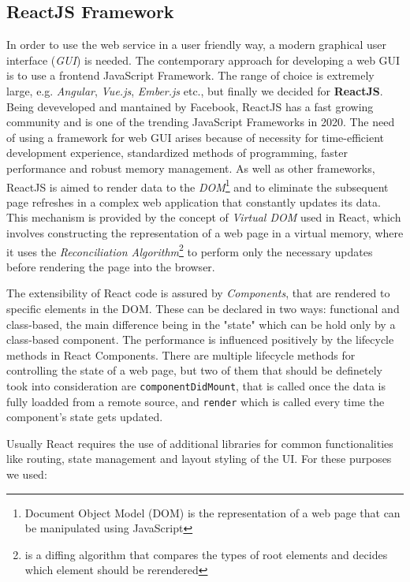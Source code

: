 \subsection{ReactJS Framework}
In order to use the web service in a user friendly way, a modern graphical user interface (\textit{GUI}) is needed. The contemporary approach for developing a web GUI is to use a frontend JavaScript Framework. The range of choice is extremely large, e.g. \textit{Angular}, \textit{Vue.js}, \textit{Ember.js} etc., but finally we decided for \textbf{ReactJS}. Being deveveloped and mantained by Facebook, ReactJS has a fast growing community and is one of the trending JavaScript Frameworks in 2020. The need of using a framework for web GUI arises because of necessity for time-efficient development experience, standardized methods of programming, faster performance and robust memory management. As well as other frameworks, ReactJS is aimed to render data to the \textit{DOM}\footnote{Document Object Model (DOM) is the representation of a web page that can be manipulated using JavaScript} and to eliminate the subsequent page refreshes in a complex web application that constantly updates its data. This mechanism is provided by the concept of \textit{Virtual DOM} used in React, which involves constructing the representation of a web page in a virtual memory, where it uses the \textit{Reconciliation Algorithm}\footnote{is a diffing algorithm that compares the types of root elements and decides which element should be rerendered} to perform only the necessary updates before rendering the page into the browser. \par
The extensibility of React code is assured by \textit{Components}, that are rendered to specific elements in the DOM. These can be declared in two ways: functional and class-based, the main difference being in the "state" which can be hold only by a class-based component. The performance is influenced positively by the lifecycle methods in React Components. There are multiple lifecycle methods for controlling the state of a web page, but two of them that should be definetely took into consideration are \texttt{componentDidMount}, that is called once the data is fully loadded from a remote source, and \texttt{render} which is called every time the component's state gets updated. \par
Usually React requires the use of additional libraries for common functionalities like routing, state management and layout styling of the UI. For these purposes we used:


